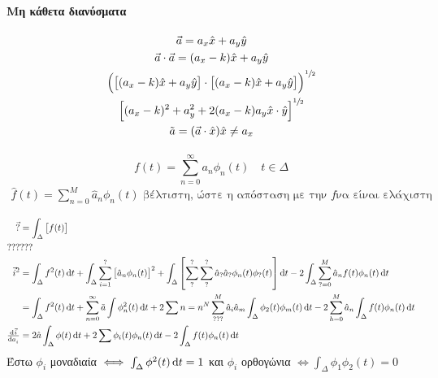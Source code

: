 \documentclass[11pt,a4paper,titlepage,fleqn]{article}
\begin{document}
    \paragraph{Μη κάθετα διανύσματα}
    \begin{gather*}
    \vec a = a_x\hat x+a_y\hat y\\
    \vec a \cdot \vec a = (a_x-k)\hat x+a_y\hat y\\
    \left(
    \left[ (a_x-k)\hat x+a_y\hat y \right]\cdot
    \left[ (a_x-k)\hat x+a_y\hat y \right]
    \right)^{\sfrac{1}{2}}\\
    \left[
    (a_x-k)^2+a_y^2+2(a_x-k)a_y\hat x\cdot\hat y
    \right]^{\sfrac{1}{2}} \\
    \tilde a = (\vec a \cdot \hat x)\hat x \neq a_x
    \end{gather*}


    \paragraph{}
    \[
    f(t)=\sum_{n=0}^\infty a_n\phi_n(t)\quad t \in \Delta
    \]\begin{gather*}
    \hat f(t)=\sum_{n=0}^M \hat a_n\phi_n(t) \text{ βέλτιστη, ώστε η απόσταση με την $f$
    	να είναι ελάχιστη}  \\
    \end{gather*}
    \begin{align*}
    \vec ? &= \int_\Delta\left[
    f(t) %
    \right] \\ ??? & ??? \\
    \vec i^2 &= \int_\Delta f^2(t)\dif t + \int_\Delta
    \sum_{i=1}^? \left[ \hat a_n\phi_n(t) \right]^2
    +\int_\Delta\left[
    \sum_?^?\sum_?^? \hat a_? \hat a_? \phi_n(t)\phi_?(t)
    \right]\dif t
    -2\int_\Delta \sum_{?=0}^M \hat a_nf(t)\phi_n(t)\dif t
    \\ &= \int_\Delta f^2(t)\dif t
    + \sum_{n=0}^\infty\tilde a\int \phi_n^2(t)\dif t
    + 2\sum{n=n}^N\sum_{???}^M\hat a_i\hat a_m\int_\Delta \phi_2(t)\phi_m(t)\dif t
    - 2\sum_{h=0}^M \hat a_n\int_\Delta f(t)\phi_n(t)\dif t \\
    \od{\vec i}{a_i} &= 2\hat a \int_\Delta \phi(t)\dif t
    + 2 \sum \phi_i(t)\phi_n(t)\dif t -2\int_\Delta f(t)\phi_n(t)\dif t
    \end{align*}%
    Έστω \( \phi_i \) μοναδιαία \( \iff \int_\Delta \phi^2(t)\dif t = 1 \)
    και \( \phi_i \) ορθογώνια \( \iff \int_\Delta \phi_1\phi_2(t)=0 \)
    
\end{document}
